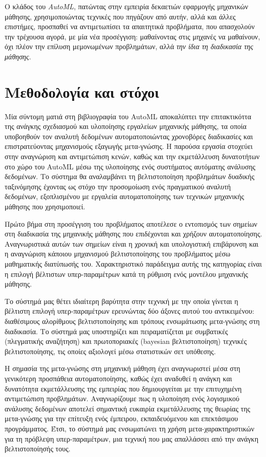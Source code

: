 Ο κλάδος του \textit{AutoML}, πατώντας στην εμπειρία δεκαετιών εφαρμογής μηχανικών μάθησης, χρησιμοποιώντας τεχνικές που πηγάζουν από αυτήν, αλλά και άλλες επιστήμες, προσπαθεί να αντιμετωπίσει τα απαιτητικά προβλήματα, που απασχολούν την τρέχουσα αγορά, με μία νέα προσέγγιση: μαθαίνοντας στις μηχανές να μαθαίνουν, όχι πλέον την επίλυση μεμονωμένων προβλημάτων, αλλά \textit{την ίδια τη διαδικασία της μάθησης}. 


\section{Μεθοδολογία και στόχοι} Μία σύντομη ματιά στη βιβλιογραφία του AutoML αποκαλύπτει την επιτακτικόττα της ανάγκης σχεδιασμού και υλοποίησης εργαλείων μηχανικής μάθησης, τα οποία υποβοηθούν τον αναλυτή δεδομένων αυτοματοποιώντας χρονοβόρες διαδικασίες και επιστρατεύοντας μηχανισμούς εξαγωγής μετα-γνώσης. Η παρούσα εργασία στοχεύει στην αναγνώριση και αντιμετώπιση κενών, καθώς και την εκμετάλλευση δυνατοτήτων στο χώρο του AutoML μέσω της υλοποίησης ενός συστήματος αυτόματης ανάλυσης δεδομένων. Το σύστημα θα αναλαμβάνει τη βελτιστοποίηση προβλημάτων δυαδικής ταξινόμησης έχοντας ως στόχο την προσομοίωση ενός πραγματικού αναλυτή δεδομένων, εξοπλισμένου με εργαλεία αυτοματοποίησης των τεχνικών μηχανικής μάθησης που χρησιμοποιεί.

Πρώτο βήμα στη προσέγγιση του προβλήματος αποτέλεσε ο εντοπισμός των σημείων στη διαδικασία της μηχανικής μάθησης που επιδέχονται και χρήζουν αυτοματοποίησης. Αναγνωριστικά αυτών των σημείων είναι η χρονική και υπολογιστική επιβάρυνση και η αναγνώριση κάποιου μηχανισμού βελτιστοποίησης του προβλήματος μέσω μαθηματικής διατύπωσής του. Χαρακτηριστικό παράδειγμα αυτής της κατηγορίας είναι η επιλογή βέλτιστων υπερ-παραμέτρων κατά τη ρύθμιση ενός μοντέλου μηχανικής μάθησης.

Το σύστημά μας θέτει ιδιαίτερη βαρύτητα στην τεχνική με την οποία γίνεται η βέλτιστη επιλογή υπερ-παραμέτρων ερευνώντας δύο άξονες αυτού του αντικειμένου: διαθέσιμους αλορίθμους βελτιστοποίησης και τρόπους ενσωμάτωσης μετα-γνώσης στη διαδικασία. Το σύστημά μας υποστηρίζει και πειραματίζεται με συμβατικές (πλεγματικής αναζήτηση) και πρωτοποριακές (bayesian βελτιστοποίηση) τεχνικές βελτιστοποίησης, τις οποίες αξιολογεί μέσω στατιστικών σετ υπόθεσης.

Η σημασία της μετα-γνώσης στη μηχανική μάθηση έχει αναγνωριστεί μέσα στη  γενικότερη προσπάθεια αυτοματοποίησης, καθώς έχει αναδυθεί η ανάγκη και δυνατότητα εκμετάλλευσης της εμπειρίας που δημιουργείται με την επιτυχημένη αντιμετώπιση προβλημάτων. Αναγνωρίζουμε πως η υλοποίηση ενός λογισμικού ανάλυσης δεδομένων αποτελεί σημαντική ευκαιρία εκμετάλλευσης της θεωρίας της μετα-γνώσης για την επίτευξη ενός έμπειρου, εκπαιδευόμενου και επεκτάσιμου προγράμματος. Έτσι, το σύστημά μας ενσωματώνει τη χρήση μετα-χαρακτηριστικών για τη πρόβλεψη υπερ-παραμέτρων, μια τεχνική που μας απαλλάσσει από την ανάγκη βελτιστοποίησής τους. 

